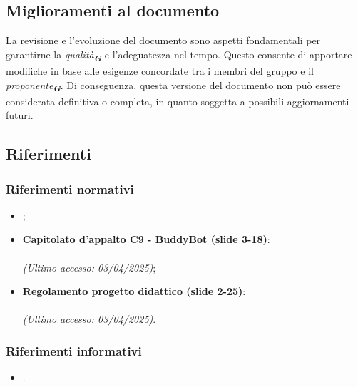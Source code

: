 \subsection{Miglioramenti al documento}
La revisione e l’evoluzione del documento sono aspetti fondamentali per garantirne la \emph{qualità}\textsubscript{\textbf{\textit{G}}}
e l’adeguatezza nel tempo.
Questo consente di apportare modifiche in base alle esigenze concordate tra i membri del gruppo e il
\emph{proponente}\textsubscript{\textbf{\textit{G}}}.
Di conseguenza, questa versione del documento non può essere considerata definitiva o completa, in quanto soggetta a possibili
aggiornamenti futuri.

\subsection{Riferimenti}
\label{sec:riferimenti}

\subsubsection{Riferimenti normativi}
\begin{itemize}
    \item {}; \\
    \item \textbf{Capitolato d'appalto C9 - BuddyBot (slide 3-18)}: \\
    \\
    \emph{(Ultimo accesso: 03/04/2025)};\\
    \item \textbf{Regolamento progetto didattico (slide 2-25)}:\\
    \\
    \emph{(Ultimo accesso: 03/04/2025)}.\\
\end{itemize}

\subsubsection{Riferimenti informativi}
\begin{itemize}
    \item {}. \\
\end{itemize}
